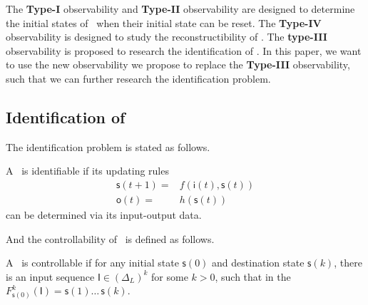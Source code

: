  
The {\bf Type-I} observability and {\bf Type-II} observability are designed to determine the initial states of \BCNs\ when their initial state can be reset. The {\bf Type-IV} observability is designed to study the reconstructibility of \BCN. The {\bf type-III} observability is proposed to research the identification of \BCNs. In this paper, we want to use the new observability we propose to replace the {\bf Type-III} observability, such that we can further research the identification problem.


\subsection{Identification of \BCNs}
The identification problem is stated as follows. 
\begin{definition}[Identifiability]
	A \BCN\ is identifiable if its updating rules 
	\begin{equation*}
    		\begin{split}
		\mathsf{s}(t+1)=&f(\mathsf{i}(t),\mathsf{s}(t))\\
		\mathsf{o}(t)=&h(\mathsf{s}(t))
		\end{split}
	\end{equation*}
	can be determined via its input-output data. 
\end{definition}

And the controllability of \BCNs\ is defined as follows.
\begin{definition}[Controllability]
	A \BCN\ is controllable if for any initial state $\mathsf{s}(0)$ and destination state $\mathsf{s}(k)$, there is an input sequence $\mathsf{I}\in(\Delta_L)^k$ for some $k>0$, such that in the $F^k_{\mathsf{s}(0)}(\mathsf{I})=\mathsf{s}(1) \ldots\, \mathsf{s}(k)$.
\end{definition}

